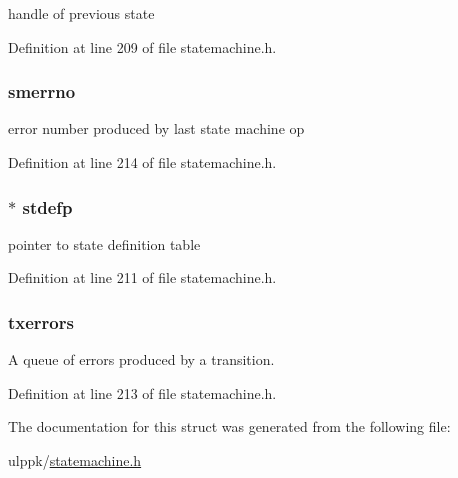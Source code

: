 handle of previous state 



Definition at line 209 of file statemachine.\-h.

\hypertarget{struct__state__table_af4ee1f3bcd55f0bfd85db2c6443a76a4}{
\subsubsection[{smerrno}]{ smerrno}}\label{struct__state__table_af4ee1f3bcd55f0bfd85db2c6443a76a4}


error number produced by last state machine op 



Definition at line 214 of file statemachine.\-h.

\hypertarget{struct__state__table_a95b706e8e406f433cf52c010bdcdd8d3}{
\subsubsection[{stdefp}]{$\ast$ stdefp}}\label{struct__state__table_a95b706e8e406f433cf52c010bdcdd8d3}


pointer to state definition table 



Definition at line 211 of file statemachine.\-h.

\hypertarget{struct__state__table_a706136e01bcc519c6362006786324228}{
\subsubsection[{txerrors}]{ txerrors}}\label{struct__state__table_a706136e01bcc519c6362006786324228}


A queue of errors produced by a transition. 



Definition at line 213 of file statemachine.\-h.



The documentation for this struct was generated from the following file\-:\begin{DoxyCompactItemize}
\item 
ulppk/\hyperlink{statemachine_8h}{statemachine.\-h}\end{DoxyCompactItemize}

